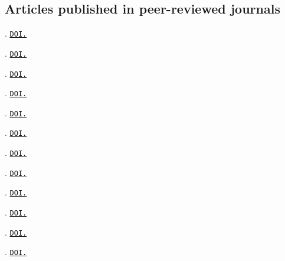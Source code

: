 \subsection{Articles published in peer-reviewed journals}
\begin{etaremune}[leftmargin=2.75cm,itemsep=2pt]

\item {.
\href{https://doi.org/10.1371/journal.pclm.0000823}{\texttt{DOI.}}}
\item {}. \href{https://doi.org/10.1016/j.crsust.2025.100295}{\texttt{DOI.}}
\item {}. \href{https://www.doi.org/10.1016/j.erss.2024.103819}{\texttt{DOI.}}
\item {}. \href{https://www.doi.org/10.1371/journal.pclm.0000132}{\texttt{DOI.}} 
\item {}. \href{https://www.doi.org/10.1016/j.trd.2023.103626}{\texttt{DOI.}} 
\item {}. \href{https://www.doi.org/10.1080/01441647.2021.2023693}{\texttt{DOI.}} 
\item  {}. \href{https://www.doi.org/10.1016/j.enpol.2022.113047}{\texttt{DOI.}} 
\item {}. \href{https://www.doi.org/10.1016/j.tra.2022.03.025}{\texttt{DOI.}} 
\item {}. \href{https://www.doi.org/10.1016/j.jclepro.2022.131774}{\texttt{DOI.}} 
\item {}. \href{https://www.doi.org/10.1088/1748-9326/ac3531}{\texttt{DOI.}}
\item {}. \href{https://www.doi.org/10.1016/j.trd.2020.102615}{\texttt{DOI.}} 
\item {}. \href{https://www.doi.org/10.1088/1748-9326/ab90a5}{\texttt{DOI.}} 
\end{etaremune}


\clearpage
